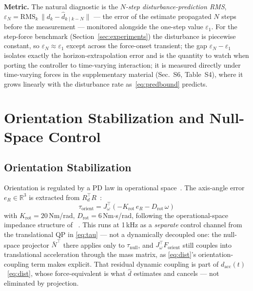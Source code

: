 \documentclass[journal]{IEEEtran}
\newcommand{\dhat}{\hat{d}}
\begin{document}
\textbf{Metric.} The natural diagnostic is the \emph{$N$-step
disturbance-prediction RMS}, $\varepsilon_N=\mathrm{RMS}_k\,\|d_k-\dhat_{k\mid
k-N}\|$ --- the error of the estimate propagated $N$ steps before the
measurement --- monitored alongside the one-step value $\varepsilon_1$. For
the step-force benchmark (Section~\ref{sec:experiments}) the disturbance is
piecewise constant, so $\varepsilon_N\approx\varepsilon_1$ except across the
force-onset transient; the gap $\varepsilon_N-\varepsilon_1$ isolates exactly
the horizon-extrapolation error and is the quantity to watch when porting the
controller to time-varying interaction; it is measured directly under
time-varying forces in the supplementary material (Sec.~S6, Table~S4), where
it grows linearly with the disturbance rate as~\eqref{eq:predbound} predicts.

\section{Orientation Stabilization and Null-Space Control}

\subsection{Orientation Stabilization}

Orientation is regulated by a PD law in operational
space~\cite{khatib1987unified}.
The axis-angle error $e_R\in\mathbb{R}^3$ is extracted from
$R_d^\top R$~\cite{siciliano2009robotics}:
\begin{equation}\label{eq:torient}
  \tau_{\text{orient}} = J_\omega^\top(-K_{\text{rot}}\,e_R - D_{\text{rot}}\,\omega)
\end{equation}
with $K_{\text{rot}}=20$\,Nm/rad, $D_{\text{rot}}=6$\,Nm$\cdot$s/rad,
following the operational-space impedance structure of~%
\cite{khatib1987unified,albu2007unified}.
This runs at 1\,kHz as a \emph{separate} control channel from the
translational QP in \eqref{eq:tau} --- not a dynamically decoupled one:
the null-space projector $\bar N^\top$ there applies only to
$\tau_{\text{null}}$, and $J_\omega^\top F_{\text{orient}}$ still couples
into translational acceleration through the mass matrix, as
\eqref{eq:dist}'s orientation-coupling term makes explicit. That residual
dynamic coupling is part of $d_{\text{acc}}(t)$~\eqref{eq:dist}, whose
force-equivalent is what $\dhat$ estimates and cancels --- not eliminated
by projection.
\end{document}
